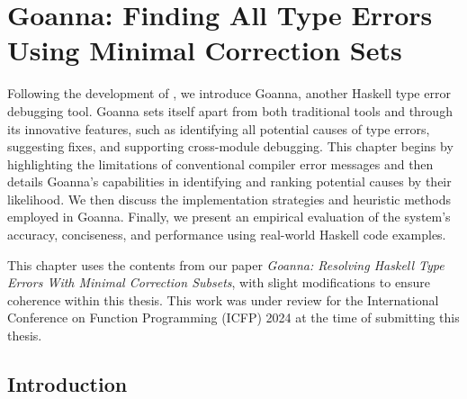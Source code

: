 
\chapter{Goanna: Finding All Type Errors Using Minimal Correction Sets} 

\label{chap:goanna} 
\graphicspath{{Figures/Goanna}}


Following the development of \chameleon{}, we introduce Goanna, another Haskell type error debugging tool. Goanna sets itself apart from both traditional tools and \chameleon{} through its innovative features, such as identifying all potential causes of type errors, suggesting fixes, and supporting cross-module debugging. This chapter begins by highlighting the limitations of conventional compiler error messages and then details Goanna's capabilities in identifying and ranking potential causes by their likelihood. We then discuss the implementation strategies and heuristic methods employed in Goanna. Finally, we present an empirical evaluation of the system's accuracy, conciseness, and performance using real-world Haskell code examples.


 This chapter uses the contents from our paper \textit{Goanna: Resolving Haskell Type Errors With Minimal Correction Subsets}, with slight modifications to ensure coherence within this thesis. This work was under review for the International Conference on Function Programming (ICFP) 2024 at the time of submitting this thesis.



\section{Introduction} \label{sec:introduction}
    

